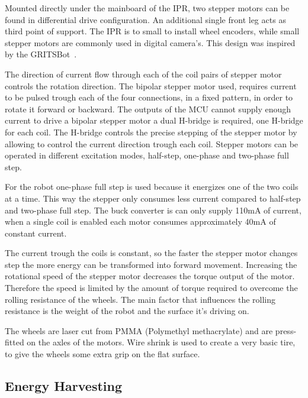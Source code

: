 \documentclass[letterpaper, 10 pt, conference]{ieeeconf}  %
\begin{document}

Mounted directly under the mainboard of the IPR, two stepper motors can be found in differential drive configuration.
An additional single front leg acts as third point of support.
The IPR is to small to install wheel encoders, while small stepper motors are commonly used in digital camera's.
This design was inspired by the GRITSBot~\cite{pickem_icra_2015}.

The direction of current flow through each of the coil pairs of stepper motor controls the rotation direction.
The bipolar stepper motor used, requires current to be pulsed trough each of the four connections, in a fixed pattern, in order to rotate it forward or backward.
The outputs of the MCU cannot supply enough current to drive a bipolar stepper motor a dual H-bridge is required, one H-bridge for each coil.
The H-bridge controls the precise stepping of the stepper motor by allowing to control the current direction trough each coil.
Stepper motors can be operated in different excitation modes, half-step, one-phase and two-phase full step.

For the robot one-phase full step is used because it energizes one of the two coils at a time.
This way the stepper only consumes less current compared to half-step and two-phase full step.
The buck converter is can only supply 110mA of current, when a single coil is enabled each motor consumes approximately 40mA of constant current.

The current trough the coils is constant, so the faster the stepper motor changes step the more energy can be transformed into forward movement.
Increasing the rotational speed of the stepper motor decreases the torque output of the motor.
Therefore the speed is limited by the amount of torque required to overcome the rolling resistance of the wheels.
The main factor that influences the rolling resistance is the weight of the robot and the surface it's driving on.

The wheels are laser cut from PMMA (Polymethyl methacrylate) and are press-fitted on the axles of the motors.
Wire shrink is used to create a very basic tire, to give the wheels some extra grip on the flat surface.

\subsection{Energy Harvesting}
\end{document}
